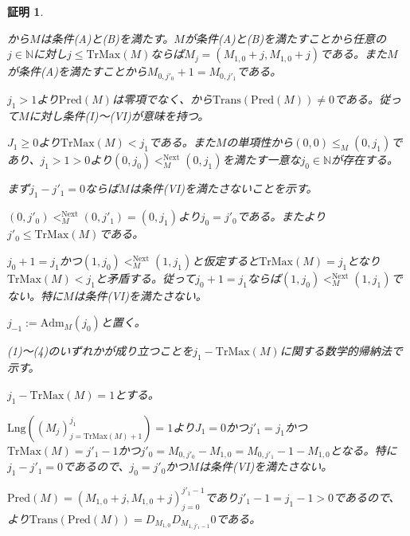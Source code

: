 \documentclass[dvipdfmx,uplatex]{jsarticle}
\theoremstyle{customnonumberbreakfortheorem}
\theoremstyle{customnonumberbreakforproof}
\newtheorem{hideableproof}{証明}
\begin{document}
\begin{hideableproof}
	\begin{indented}
		\item {}から\(M\)は条件(A)と(B)を満たす。\(M\)が条件(A)と(B)を満たすことから任意の\(j \in \mathbb{N}\)に対し\(j \leq \textrm{TrMax}(M)\)ならば\(M_j = (M_{1,0} + j, M_{1,0} + j)\)である。また\(M\)が条件(A)を満たすことから\(M_{0,j'_0}+1 = M_{0,j'_1}\)である。
		\item \(j_1 > 1\)より\(\textrm{Pred}(M)\)は零項でなく、から\(\textrm{Trans}(\textrm{Pred}(M)) \neq 0\)である。従って\(M\)に対し条件(I)～(VI)が意味を持つ。
		\item \(J_1 \geq 0\)より\(\textrm{TrMax}(M) < j_1\)である。また\(M\)の単項性から\((0,0) \leq_M (0,j_1)\)であり、\(j_1 > 1 > 0\)より\((0,j_0) <_M^{\textrm{Next}} (0,j_1)\)を満たす一意な\(j_0 \in \mathbb{N}\)が存在する。
		\item まず\(j_1-j'_1 = 0\)ならば\(M\)は条件(VI)を満たさないことを示す。
		\begin{indented}
			\item \((0,j'_0) <_M^{\textrm{Next}} (0,j'_1) = (0,j_1)\)より\(j_0 = j'_0\)である。またより\(j'_0 \leq \textrm{TrMax}(M)\)である。
			\item \(j_0+1 = j_1\)かつ\((1,j_0) <_M^{\textrm{Next}} (1,j_1)\)と仮定すると\(\textrm{TrMax}(M) = j_1\)となり\(\textrm{TrMax}(M) < j_1\)と矛盾する。従って\(j_0+1 = j_1\)ならば\((1,j_0) <_M^{\textrm{Next}} (1,j_1)\)でない。特に\(M\)は条件(VI)を満たさない。
		\end{indented}
		\item \(j_{-1} := \textrm{Adm}_M(j_0)\)と置く。
		\item (1)～(4)のいずれかが成り立つことを\(j_1 - \textrm{TrMax}(M)\)に関する数学的帰納法で示す。
		\item \(j_1 - \textrm{TrMax}(M) = 1\)とする。
		\begin{indented}
			\item \(\textrm{Lng}((M_j)_{j=\textrm{TrMax}(M)+1}^{j_1}) = 1\)より\(J_1 = 0\)かつ\(j'_1 = j_1\)かつ\(\textrm{TrMax}(M) = j'_1-1\)かつ\(j'_0 = M_{0,j'_0}-M_{1,0} = M_{0,j'_1}-1-M_{1,0}\)となる。特に\(j_1-j'_1 = 0\)であるので、\(j_0 = j'_0\)かつ\(M\)は条件(VI)を満たさない。
			\item \(\textrm{Pred}(M) = (M_{1,0}+j,M_{1,0}+j)_{j=0}^{j'_1-1}\)であり\(j'_1-1 = j_1-1 > 0\)であるので、より\(\textrm{Trans}(\textrm{Pred}(M)) = D_{M_{1,0}} D_{M_{1,j'_1-1}} 0\)である。

\end{indented}
\end{indented}
\end{hideableproof}
\end{document}
